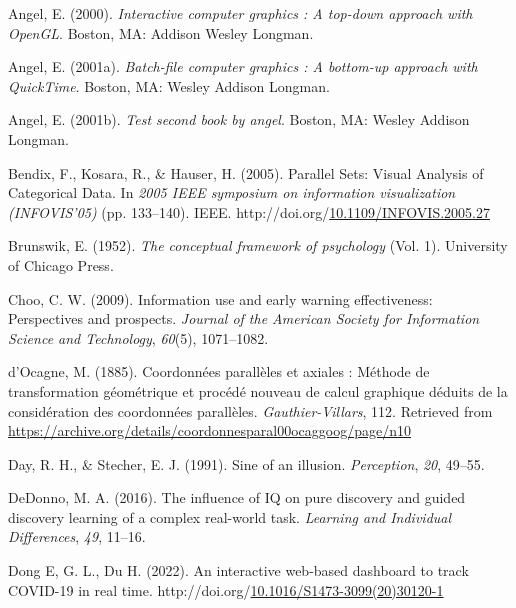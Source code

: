 \documentclass[print]{nuthesis}
\newlength{\cslhangindent}
\newenvironment{CSLReferences}[2]%
{\setlength{\parindent}{0pt}%
\everypar{\setlength{\hangindent}{\cslhangindent}}\ignorespaces}%
{\par}
\begin{document}
\hypertarget{refs}{}
\begin{CSLReferences}{1}{0}
\leavevmode\hypertarget{ref-angel2000}{}%
Angel, E. (2000). \emph{Interactive computer graphics : A top-down approach with OpenGL}. Boston, MA: Addison Wesley Longman.

\leavevmode\hypertarget{ref-angel2001}{}%
Angel, E. (2001a). \emph{Batch-file computer graphics : A bottom-up approach with QuickTime}. Boston, MA: Wesley Addison Longman.

\leavevmode\hypertarget{ref-angel2002a}{}%
Angel, E. (2001b). \emph{Test second book by angel}. Boston, MA: Wesley Addison Longman.

\leavevmode\hypertarget{ref-Bendix:2005}{}%
Bendix, F., Kosara, R., \& Hauser, H. (2005). {Parallel Sets: Visual Analysis of Categorical Data}. In \emph{2005 IEEE symposium on information visualization (INFOVIS'05)} (pp. 133--140). IEEE. http://doi.org/\href{https://doi.org/10.1109/INFOVIS.2005.27}{10.1109/INFOVIS.2005.27}

\leavevmode\hypertarget{ref-brunswik1952}{}%
Brunswik, E. (1952). \emph{The conceptual framework of psychology} (Vol. 1). University of Chicago Press.

\leavevmode\hypertarget{ref-choo2009}{}%
Choo, C. W. (2009). Information use and early warning effectiveness: Perspectives and prospects. \emph{Journal of the American Society for Information Science and Technology}, \emph{60}(5), 1071--1082.

\leavevmode\hypertarget{ref-dOcagne:1885}{}%
d'Ocagne, M. (1885). {Coordonnées parallèles et axiales : Méthode de transformation géométrique et procédé nouveau de calcul graphique déduits de la considération des coordonnées parallèles}. \emph{Gauthier-Villars}, 112. Retrieved from \url{https://archive.org/details/coordonnesparal00ocaggoog/page/n10}

\leavevmode\hypertarget{ref-sine}{}%
Day, R. H., \& Stecher, E. J. (1991). Sine of an illusion. \emph{Perception}, \emph{20}, 49--55.

\leavevmode\hypertarget{ref-dedonno}{}%
DeDonno, M. A. (2016). The influence of IQ on pure discovery and guided discovery learning of a complex real-world task. \emph{Learning and Individual Differences}, \emph{49}, 11--16.

\leavevmode\hypertarget{ref-JHPHDashboard}{}%
Dong E, G. L., Du H. (2022). An interactive web-based dashboard to track COVID-19 in real time. http://doi.org/\href{https://doi.org/10.1016/S1473-3099(20)30120-1}{10.1016/S1473-3099(20)30120-1}


\end{CSLReferences}
\end{document}
